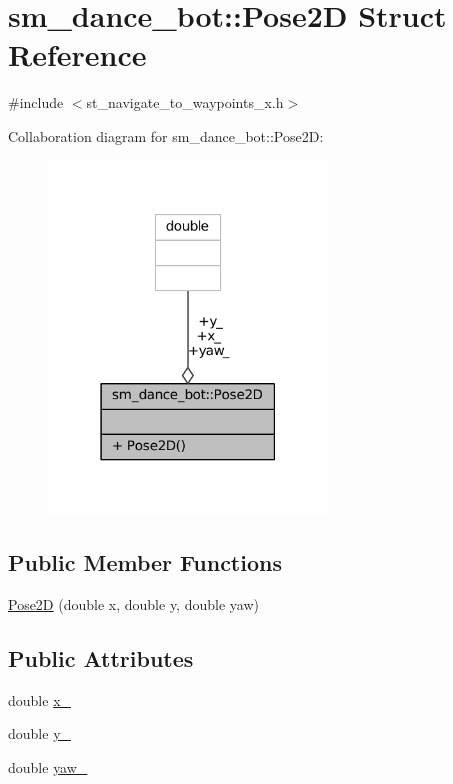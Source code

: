 \hypertarget{structsm__dance__bot_1_1Pose2D}{}\section{sm\+\_\+dance\+\_\+bot\+:\+:Pose2D Struct Reference}
\label{structsm__dance__bot_1_1Pose2D}


{\ttfamily \#include $<$st\+\_\+navigate\+\_\+to\+\_\+waypoints\+\_\+x.\+h$>$}



Collaboration diagram for sm\+\_\+dance\+\_\+bot\+:\+:Pose2D\+:
\nopagebreak
\begin{figure}[H]
\begin{center}
\leavevmode
\includegraphics[width=210pt]{structsm__dance__bot_1_1Pose2D__coll__graph}
\end{center}
\end{figure}
\subsection*{Public Member Functions}
\begin{DoxyCompactItemize}
\item 
\hyperlink{structsm__dance__bot_1_1Pose2D_a0dd1f8fb3a3a83211a8a958956ef1d84}{Pose2D} (double x, double y, double yaw)
\end{DoxyCompactItemize}
\subsection*{Public Attributes}
\begin{DoxyCompactItemize}
\item 
double \hyperlink{structsm__dance__bot_1_1Pose2D_a3430dc7f2d3c63774b6ba228cb92ace8}{x\+\_\+}
\item 
double \hyperlink{structsm__dance__bot_1_1Pose2D_a208d60512a4132516a35e9a9dbf58819}{y\+\_\+}
\item 
double \hyperlink{structsm__dance__bot_1_1Pose2D_aa1e24c51b613e1c5043ca3848c9a8ec9}{yaw\+\_\+}
\end{DoxyCompactItemize}


